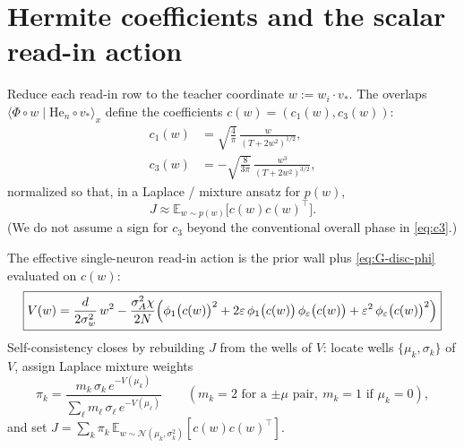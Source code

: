 \documentclass[11pt,a4paper]{article}
\begin{document}
\section{Hermite coefficients and the scalar read-in action}

Reduce each read-in row to the teacher coordinate $w:=w_i\cdot v_\ast$.
The overlaps $\langle\Phi\circ w\mid\mathrm{He}_n\circ v_\ast\rangle_x$
define the coefficients $c(w)=(c_1(w),c_3(w))$:
\begin{align}
  c_1(w)
  &=
  \sqrt{\frac{4}{\pi}}\,
  \frac{w}{(T+2w^2)^{1/2}},
  \label{eq:c1}\\
  c_3(w)
  &=
  -\sqrt{\frac{8}{3\pi}}\,
  \frac{w^3}{(T+2w^2)^{3/2}},
  \label{eq:c3}
\end{align}
normalized so that, in a Laplace / mixture ansatz for $p(w)$,
\begin{equation}
  J
  \approx
  \mathbb{E}_{w\sim p(w)}
  \bigl[c(w)c(w)^\top\bigr].
  \label{eq:J-from-c}
\end{equation}
(We do not assume a sign for $c_3$ beyond the conventional overall phase in
\eqref{eq:c3}.)

The effective single-neuron read-in action is the prior wall plus
\eqref{eq:G-disc-phi} evaluated on $c(w)$:
\begin{equation}
  \boxed{
  V(w)
  =
  \frac{d}{2\sigma_w^2}\, w^2
  -
  \frac{\sigma_A^2\chi}{2N}
  \Bigl(
    \phi_1\bigl(c(w)\bigr)^2
    +
    2\varepsilon\,
    \phi_1\bigl(c(w)\bigr)\,
    \phi_\varepsilon\bigl(c(w)\bigr)
    +
    \varepsilon^2\,
    \phi_\varepsilon\bigl(c(w)\bigr)^2
  \Bigr)
  }
  \label{eq:V}
\end{equation}
Self-consistency closes by rebuilding $J$ from the wells of $V$:
locate wells $\{\mu_k,\sigma_k\}$ of $V$, assign Laplace mixture weights
\begin{equation}
  \pi_k
  =
  \frac{
    m_k\,\sigma_k\, e^{-V(\mu_k)}
  }{
    \sum_\ell m_\ell\,\sigma_\ell\, e^{-V(\mu_\ell)}
  }
  \qquad
  (m_k=2\text{ for a $\pm\mu$ pair},\ m_k=1\text{ if }\mu_k=0),
\end{equation}
and set
$J=\sum_k\pi_k\,\mathbb{E}_{w\sim\mathcal{N}(\mu_k,\sigma_k^2)}[c(w)c(w)^\top]$.
\end{document}

